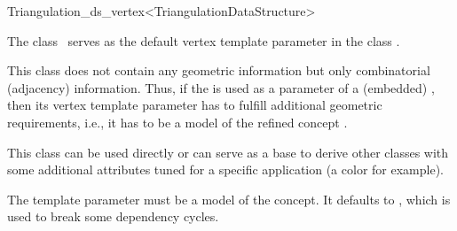 \begin{ccRefClass}{Triangulation_ds_vertex<TriangulationDataStructure>}

\ccDefinition

The class \ccRefName\ serves as the default vertex template parameter in the
class .

This class does not contain any geometric information but only combinatorial
(adjacency) information. Thus, if the  is
used as a parameter of a (embedded) , then its vertex template parameter
has to fulfill additional geometric requirements, {i.e.}, it has to be a
model of the refined concept .

This class can be used directly or can serve as a base to derive other classes
with some additional attributes tuned for a specific application (a color for
example).


\ccParameters

The template parameter  must be a model of the
 concept. It defaults to , which is
used to break some dependency cycles.

\ccIsModel


\ccSeeAlso


\end{ccRefClass}
